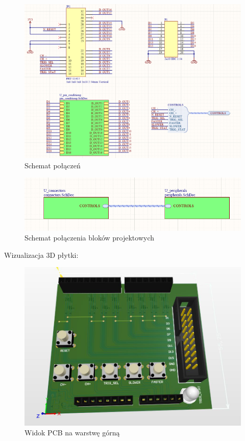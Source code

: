 \begin{figure}[H]
\begin{center}
\includegraphics[width=4.5 in]{images/connectors.png}
\end{center}
\caption{Schemat połączeń}
\label{fig:connectors}
\end{figure}

\begin{figure}[H]
\begin{center}
\includegraphics[width=4 in]{images/top.png}
\end{center}
\caption{Schemat połączenia bloków projektowych}
\label{fig:top}
\end{figure}

Wizualizacja 3D płytki:

\begin{figure}[H]
\begin{center}
\includegraphics[width=4 in]{images/3D_1.png}
\end{center}
\caption{Widok PCB na warstwę górną}
\label{fig:PCB_3D_top}
\end{figure}

